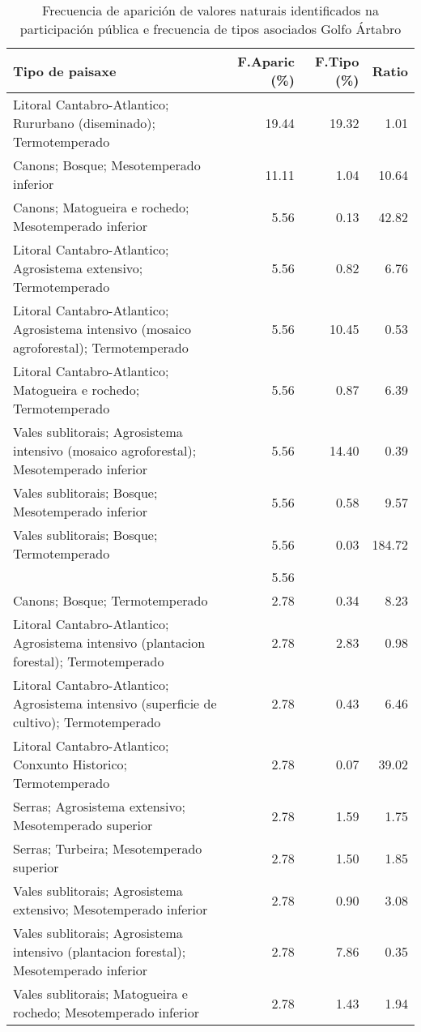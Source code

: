 \begin{table}[p]
\centering
\caption{Frecuencia de aparición de valores naturais identificados na participación pública e frecuencia de tipos asociados Golfo Ártabro} 
\label{vsixotnat1}
\begin{tabular}{lrrr}
  \hline
Tipo de paisaxe & F.Aparic (\%) & F.Tipo (\%) & Ratio \\ 
  \hline
Litoral Cantabro-Atlantico; Rururbano (diseminado); Termotemperado & 19.44 & 19.32 & 1.01 \\ 
  Canons; Bosque; Mesotemperado inferior & 11.11 & 1.04 & 10.64 \\ 
  Canons; Matogueira e rochedo; Mesotemperado inferior & 5.56 & 0.13 & 42.82 \\ 
  Litoral Cantabro-Atlantico; Agrosistema extensivo; Termotemperado & 5.56 & 0.82 & 6.76 \\ 
  Litoral Cantabro-Atlantico; Agrosistema intensivo (mosaico agroforestal); Termotemperado & 5.56 & 10.45 & 0.53 \\ 
  Litoral Cantabro-Atlantico; Matogueira e rochedo; Termotemperado & 5.56 & 0.87 & 6.39 \\ 
  Vales sublitorais; Agrosistema intensivo (mosaico agroforestal); Mesotemperado inferior & 5.56 & 14.40 & 0.39 \\ 
  Vales sublitorais; Bosque; Mesotemperado inferior & 5.56 & 0.58 & 9.57 \\ 
  Vales sublitorais; Bosque; Termotemperado & 5.56 & 0.03 & 184.72 \\ 
   & 5.56 &  &  \\ 
  Canons; Bosque; Termotemperado & 2.78 & 0.34 & 8.23 \\ 
  Litoral Cantabro-Atlantico; Agrosistema intensivo (plantacion forestal); Termotemperado & 2.78 & 2.83 & 0.98 \\ 
  Litoral Cantabro-Atlantico; Agrosistema intensivo (superficie de cultivo); Termotemperado & 2.78 & 0.43 & 6.46 \\ 
  Litoral Cantabro-Atlantico; Conxunto Historico; Termotemperado & 2.78 & 0.07 & 39.02 \\ 
  Serras; Agrosistema extensivo; Mesotemperado superior & 2.78 & 1.59 & 1.75 \\ 
  Serras; Turbeira; Mesotemperado superior & 2.78 & 1.50 & 1.85 \\ 
  Vales sublitorais; Agrosistema extensivo; Mesotemperado inferior & 2.78 & 0.90 & 3.08 \\ 
  Vales sublitorais; Agrosistema intensivo (plantacion forestal); Mesotemperado inferior & 2.78 & 7.86 & 0.35 \\ 
  Vales sublitorais; Matogueira e rochedo; Mesotemperado inferior & 2.78 & 1.43 & 1.94 \\ 
   \hline
\end{tabular}
\end{table}
